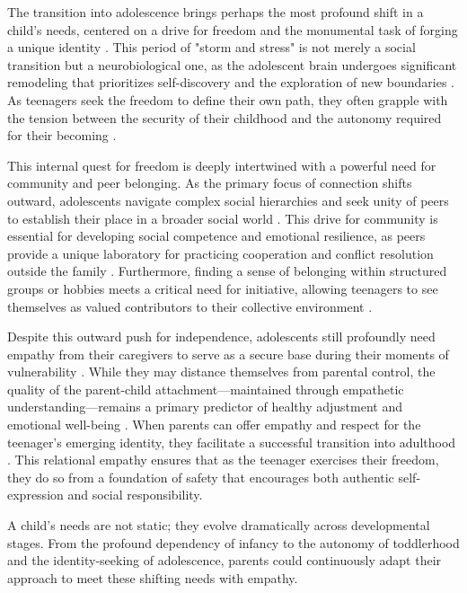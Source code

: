 The transition into adolescence brings perhaps the most profound shift in a child's needs, centered on a drive for freedom and the monumental task of forging a unique identity \citep{erikson1950}. 
This period of "storm and stress" is not merely a social transition but a neurobiological one, as the adolescent brain undergoes significant remodeling that prioritizes self-discovery and the exploration of new boundaries \citep{siegel2011}. 
As teenagers seek the freedom to define their own path, they often grapple with the tension between the security of their childhood and the autonomy required for their becoming \citep{marcia1966}.

This internal quest for freedom is deeply intertwined with a powerful need for community and peer belonging. 
As the primary focus of connection shifts outward, adolescents navigate complex social hierarchies and seek unity of peers to establish their place in a broader social world \citep{steinberg2005}. 
This drive for community is essential for developing social competence and emotional resilience, as peers provide a unique laboratory for practicing cooperation and conflict resolution outside the family \citep{eccles1999}. 
Furthermore, finding a sense of belonging within structured groups or hobbies meets a critical need for initiative, allowing teenagers to see themselves as valued contributors to their collective environment \citep{larson2000}.

Despite this outward push for independence, adolescents still profoundly need empathy from their caregivers to serve as a secure base during their moments of vulnerability \citep{bowlby1969}. 
While they may distance themselves from parental control, the quality of the parent-child attachment—maintained through empathetic understanding—remains a primary predictor of healthy adjustment and emotional well-being \citep{allen2007}. 
When parents can offer empathy and respect for the teenager's emerging identity, they facilitate a successful transition into adulthood \citep{rosenberg2003}. 
This relational empathy ensures that as the teenager exercises their freedom, they do so from a foundation of safety that encourages both authentic self-expression and social responsibility.

\begin{keyinsight}
A child's needs are not static; they evolve dramatically across developmental stages.
From the profound dependency of infancy to the autonomy of toddlerhood and the identity-seeking of adolescence, parents could continuously adapt their approach to meet these shifting needs with empathy.
\end{keyinsight}


